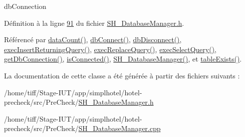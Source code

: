 db\-Connection 



Définition à la ligne \hyperlink{SH__DatabaseManager_8h_source_l00091}{91} du fichier \hyperlink{SH__DatabaseManager_8h_source}{S\-H\-\_\-\-Database\-Manager.\-h}.



Référencé par \hyperlink{classSH__DatabaseManager_ad3e372d89b60b43e3f3bae649be6d7fb}{data\-Count()}, \hyperlink{classSH__DatabaseManager_ab634ce39ef483e7ad2fe08d4b8ba74f7}{db\-Connect()}, \hyperlink{classSH__DatabaseManager_a096c26457bbb03f92283c5d104401e90}{db\-Disconnect()}, \hyperlink{classSH__DatabaseManager_a55268fae16792142072af49238f7bb94}{exec\-Insert\-Returning\-Query()}, \hyperlink{classSH__DatabaseManager_a25e0f24d7833c2728f55b85be529063d}{exec\-Replace\-Query()}, \hyperlink{classSH__DatabaseManager_ab8f9850cb68444ab9a4e613b36a3b044}{exec\-Select\-Query()}, \hyperlink{classSH__DatabaseManager_a0ce86f671946975c2e7b4ad50c9a92a2}{get\-Db\-Connection()}, \hyperlink{classSH__DatabaseManager_aba5832c8be2fe4894781c9bf34be5b8b}{is\-Connected()}, \hyperlink{classSH__DatabaseManager_a7b5d0e372c153eb59cdab98588994904}{S\-H\-\_\-\-Database\-Manager()}, et \hyperlink{classSH__DatabaseManager_ac18f4ee3abd86cb0db25b3cb593e28b8}{table\-Exists()}.



La documentation de cette classe a été générée à partir des fichiers suivants \-:\begin{DoxyCompactItemize}
\item 
/home/tiff/\-Stage-\/\-I\-U\-T/app/simplhotel/hotel-\/precheck/src/\-Pre\-Check/\hyperlink{SH__DatabaseManager_8h}{S\-H\-\_\-\-Database\-Manager.\-h}\item 
/home/tiff/\-Stage-\/\-I\-U\-T/app/simplhotel/hotel-\/precheck/src/\-Pre\-Check/\hyperlink{SH__DatabaseManager_8cpp}{S\-H\-\_\-\-Database\-Manager.\-cpp}\end{DoxyCompactItemize}
